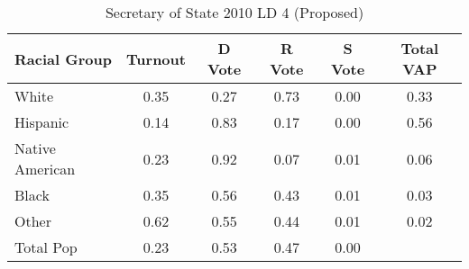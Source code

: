 \begin{table}[htb]
\begin{center}
\caption{Secretary of State 2010 LD 4 (Proposed)}
\label{sos10_vap_ld_4}
\begin{tabular}{lccccc}
  \hline
Racial Group & Turnout & D Vote & R Vote & S Vote & Total VAP \\ 
  \hline
White & 0.35 & 0.27 & 0.73 & 0.00 & 0.33 \\ 
  Hispanic & 0.14 & 0.83 & 0.17 & 0.00 & 0.56 \\ 
  Native American & 0.23 & 0.92 & 0.07 & 0.01 & 0.06 \\ 
  Black & 0.35 & 0.56 & 0.43 & 0.01 & 0.03 \\ 
  Other & 0.62 & 0.55 & 0.44 & 0.01 & 0.02 \\ 
  Total Pop & 0.23 & 0.53 & 0.47 & 0.00 &  \\ 
   \hline
\end{tabular}
\end{center}
\end{table}
